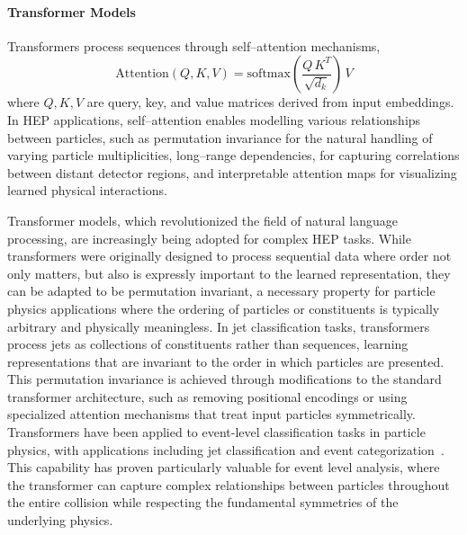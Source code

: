         \paragraph{Transformer Models}
            Transformers process sequences through self--attention mechanisms,
            \begin{equation}
                \text{Attention}(Q, K, V) = \text{softmax}\left(\frac{Q\,K^T}{\sqrt{d_k}}\right)\,V
            \end{equation}
            where \(Q, K, V\) are query, key, and value matrices derived from input embeddings.
            In HEP applications, self--attention enables modelling various relationships between particles, such as
            permutation invariance for the natural handling of varying particle multiplicities,
            long--range dependencies, for capturing correlations between distant detector regions,
            and interpretable attention maps for visualizing learned physical interactions.
    
            Transformer models, which revolutionized the field of natural language processing, are increasingly being adopted for complex HEP tasks.
            While transformers were originally designed to process sequential data where order not only matters, but also is expressly important to the learned representation, they can be adapted to be permutation invariant, a necessary property for particle physics applications where the ordering of particles or constituents is typically arbitrary and physically meaningless.
            In jet classification tasks, transformers process jets as collections of constituents rather than sequences, learning representations that are invariant to the order in which particles are presented.
            This permutation invariance is achieved through modifications to the standard transformer architecture, such as removing positional encodings or using specialized attention mechanisms that treat input particles symmetrically.
            Transformers have been applied to event-level classification tasks in particle physics, with applications including jet classification and event categorization~\cite{Kheddar2025ImageSurvey, mikuni_point_2021, builtjes_attention_2025}.
            This capability has proven particularly valuable for event level analysis, where the transformer can capture complex relationships between particles throughout the entire collision while respecting the fundamental symmetries of the underlying physics.
    
